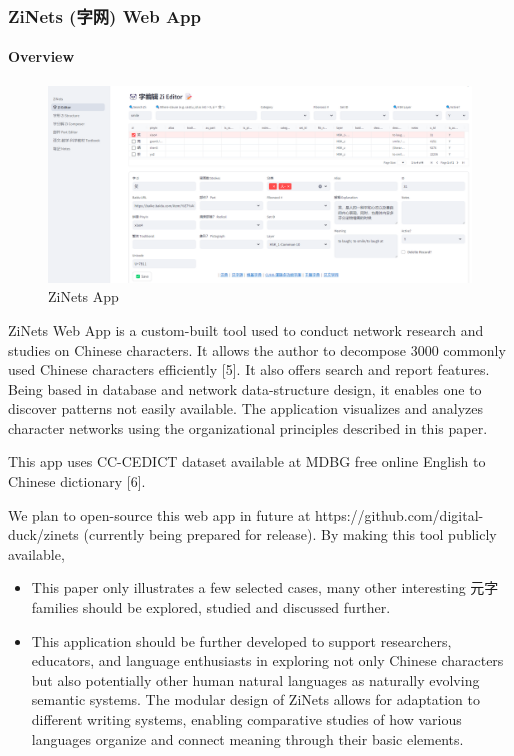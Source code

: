 \documentclass[
  11pt,
  letterpaper,
]{article}
\providecommand{\tightlist}{%
  \setlength{\itemsep}{0pt}\setlength{\parskip}{0pt}}
\begin{document}
\subsubsection{ZiNets (字网) Web App}\label{zinets-ux5b57ux7f51-web-app}

\paragraph{\texorpdfstring{Overview }{Overview  }}\label{overview}

\begin{figure}
\centering
\includegraphics{./images/app_zinets.png}
\caption{ZiNets App}
\end{figure}

ZiNets Web App is a custom-built tool used to conduct network research
and studies on Chinese characters. It allows the author to decompose
3000 commonly used Chinese characters efficiently {[}5{]}. It also
offers search and report features. Being based in database and network
data-structure design, it enables one to discover patterns not easily
available. The application visualizes and analyzes character networks
using the organizational principles described in this paper.

This app uses CC-CEDICT dataset available at MDBG free online English to
Chinese dictionary {[}6{]}.

We plan to open-source this web app in future at
https://github.com/digital-duck/zinets (currently being prepared for
release). By making this tool publicly available,

\begin{itemize}
\tightlist
\item
  This paper only illustrates a few selected cases, many other
  interesting 元字 families should be explored, studied and discussed
  further.
\item
  This application should be further developed to support researchers,
  educators, and language enthusiasts in exploring not only Chinese
  characters but also potentially other human natural languages as
  naturally evolving semantic systems. The modular design of ZiNets
  allows for adaptation to different writing systems, enabling
  comparative studies of how various languages organize and connect
  meaning through their basic elements.
\end{itemize}
\end{document}
